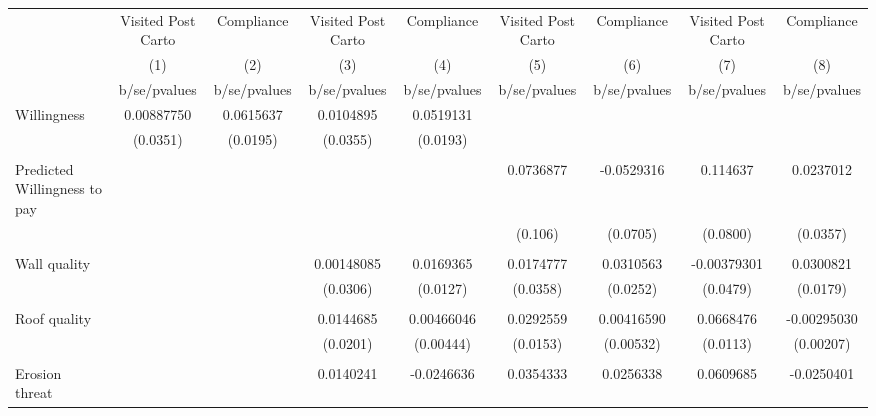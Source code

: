 {
\def\sym#1{\ifmmode^{#1}\else\(^{#1}\)\fi}
\begin{tabular}{l*{8}{c}}
\toprule
                &\multicolumn{1}{c}{Visited Post Carto}&\multicolumn{1}{c}{Compliance}&\multicolumn{1}{c}{Visited Post Carto}&\multicolumn{1}{c}{Compliance}&\multicolumn{1}{c}{Visited Post Carto}&\multicolumn{1}{c}{Compliance}&\multicolumn{1}{c}{Visited Post Carto}&\multicolumn{1}{c}{Compliance}\\
                &\multicolumn{1}{c}{(1)}&\multicolumn{1}{c}{(2)}&\multicolumn{1}{c}{(3)}&\multicolumn{1}{c}{(4)}&\multicolumn{1}{c}{(5)}&\multicolumn{1}{c}{(6)}&\multicolumn{1}{c}{(7)}&\multicolumn{1}{c}{(8)}\\
                &b/se/pvalues&b/se/pvalues&b/se/pvalues&b/se/pvalues&b/se/pvalues&b/se/pvalues&b/se/pvalues&b/se/pvalues\\
\midrule
Willingness     &0.00887750&0.0615637&0.0104895&0.0519131&         &         &         &         \\
                & (0.0351)& (0.0195)& (0.0355)& (0.0193)&         &         &         &         \\
                &         &         &         &         &         &         &         &         \\
Predicted Willingness to pay&         &         &         &         &0.0736877&-0.0529316& 0.114637&0.0237012\\
                &         &         &         &         &  (0.106)& (0.0705)& (0.0800)& (0.0357)\\
                &         &         &         &         &         &         &         &         \\
Wall quality    &         &         &0.00148085&0.0169365&0.0174777&0.0310563&-0.00379301&0.0300821\\
                &         &         & (0.0306)& (0.0127)& (0.0358)& (0.0252)& (0.0479)& (0.0179)\\
                &         &         &         &         &         &         &         &         \\
Roof quality    &         &         &0.0144685&0.00466046&0.0292559&0.00416590&0.0668476&-0.00295030\\
                &         &         & (0.0201)&(0.00444)& (0.0153)&(0.00532)& (0.0113)&(0.00207)\\
                &         &         &         &         &         &         &         &         \\
Erosion threat  &         &         &0.0140241&-0.0246636&0.0354333&0.0256338&0.0609685&-0.0250401\\

\end{tabular}}
